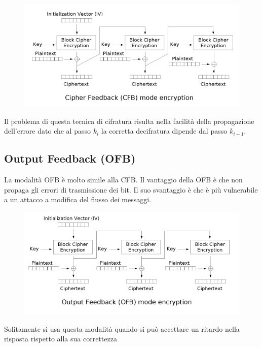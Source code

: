 \documentclass[10pt,a4paper]{article}
\begin{document}
\begin{figure}[htbp]
\includegraphics[scale=0.8]{immagini/cfb.png}
\end{figure}

Il problema di questa tecnica di cifratura risulta nella facilità della propagazione dell'errore dato che al passo $k_i$ la corretta decifratura dipende dal passo $k_{i-1}$.

\subsection{Output Feedback (OFB)}
La modalità OFB è molto simile alla CFB. Il vantaggio della OFB è che non propaga gli errori di trasmissione dei bit. Il suo svantaggio è che è più vulnerabile a un attacco a modifica del flusso dei messaggi.

\begin{figure}[htbp]
\includegraphics[scale=0.8]{immagini/ofb.png}
\end{figure}

Solitamente si usa questa modalità quando si può accettare un ritardo nella risposta rispetto alla sua correttezza
\end{document}
